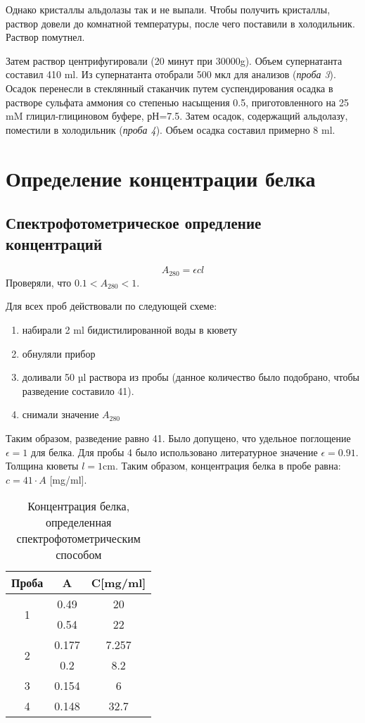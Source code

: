 Однако кристаллы альдолазы так и не выпали.
Чтобы получить кристаллы, раствор довели до комнатной температуры,
после чего поставили в холодильник. Раствор помутнел.

Затем раствор центрифугировали (20 минут при 30000g).
Объем супернатанта составил 410 ml.
Из супернатанта отобрали 500 мкл для анализов (\emph{проба 3}).
Осадок перенесли в стеклянный стаканчик путем суспендирования осадка
в растворе сульфата аммония со степенью насыщения 0.5,
приготовленного на 25 mM глицил-глициновом буфере, рН=7.5.
Затем осадок, содержащий альдолазу, поместили в холодильник (\emph{проба 4}).
Объем осадка составил примерно 8 ml.

\section{Определение концентрации белка}

\subsection{Спектрофотометрическое опредление концентраций}
$$ A_{280} = \epsilon c l $$
Проверяли, что $ 0.1 < A_{280} < 1 $.

Для всех проб действовали по следующей схеме:
\begin{enumerate}
\item набирали 2 ml бидистилированной воды в кювету
\item обнуляли прибор
\item доливали 50 µl раствора из пробы
    (данное количество было подобрано, чтобы разведение составило 41).
\item снимали значение $A_{280}$
\end{enumerate}
Таким образом, разведение равно 41.
Было допущено, что удельное поглощение $\epsilon = 1$ для белка.
Для пробы 4 было использовано литературное значение $\epsilon = 0.91$.
Толщина кюветы $l = 1 \text{cm}$.
Таким образом, концентрация белка в пробе равна: $ c=41 \cdot A $ [mg/ml].

\begin{table}[htbp]
\caption{Концентрация белка, определенная спектрофотометрическим способом}
\begin{tabular}{|c|c|c|}
\hline
Проба & A & C[mg/ml] \\
\hline
\multirow{2}{*}{1} & 0.49 & 20 \\
& 0.54 & 22 \\
\hline
\multirow{2}{*}{2} & 0.177 & 7.257 \\
& 0.2 & 8.2 \\
\hline
3 & 0.154 & 6 \\
\hline
4 & 0.148 & 32.7 \\
\hline
\end{tabular}
\label{table-spm}
\end{table}

